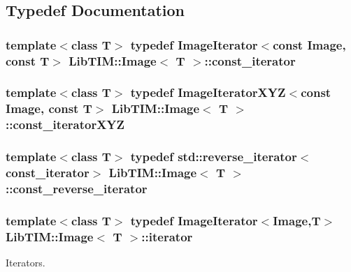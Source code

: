 \subsection{Typedef Documentation}
\subsubsection{\setlength{\rightskip}{0pt plus 5cm}template$<$class T$>$ typedef Image\-Iterator$<$const Image, const T$>$ {\bf Lib\-TIM::Image}$<$ T $>$::const\_\-iterator\hspace{0.3cm}{\tt  [inherited]}}\label{group__Image_ga4}


\subsubsection{\setlength{\rightskip}{0pt plus 5cm}template$<$class T$>$ typedef Image\-Iterator\-XYZ$<$const Image, const T$>$ {\bf Lib\-TIM::Image}$<$ T $>$::const\_\-iterator\-XYZ\hspace{0.3cm}{\tt  [inherited]}}\label{group__Image_ga6}


\subsubsection{\setlength{\rightskip}{0pt plus 5cm}template$<$class T$>$ typedef std::reverse\_\-iterator$<$const\_\-iterator$>$ {\bf Lib\-TIM::Image}$<$ T $>$::const\_\-reverse\_\-iterator\hspace{0.3cm}{\tt  [inherited]}}\label{group__Image_ga7}


\subsubsection{\setlength{\rightskip}{0pt plus 5cm}template$<$class T$>$ typedef Image\-Iterator$<$Image,T$>$ {\bf Lib\-TIM::Image}$<$ T $>$::iterator\hspace{0.3cm}{\tt  [inherited]}}\label{group__Image_ga3}


Iterators. 

